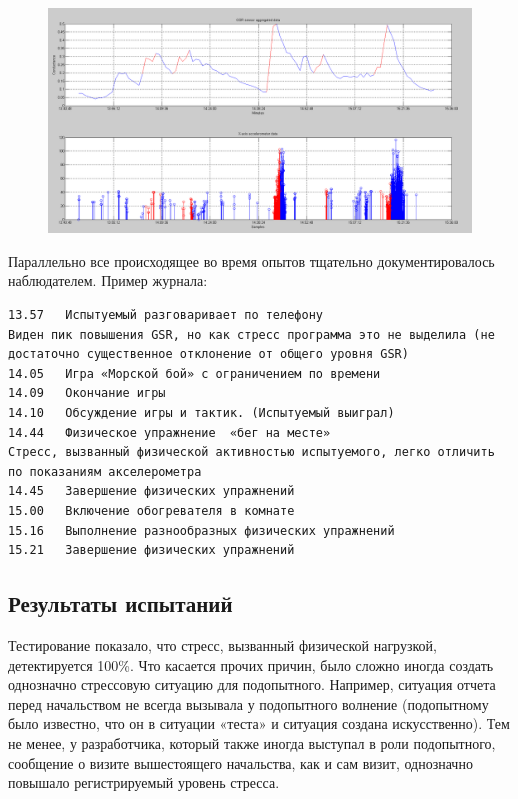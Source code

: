 \documentclass[10pt, a5paper]{article}
\begin{document}
\begin{figure}[h!]
  \centering
  \includegraphics[width=\textwidth]{107_2014_w_Karabutova_data.png}
\end{figure}

Параллельно все происходящее во время опытов тщательно документировалось наблюдателем. Пример журнала:

\begin{verbatim}
13.57	Испытуемый разговаривает по телефону 
Виден пик повышения GSR, но как стресс программа это не выделила (не достаточно существенное отклонение от общего уровня GSR)
14.05	Игра «Морской бой» с ограничением по времени
14.09 	Окончание игры
14.10 	Обсуждение игры и тактик. (Испытуемый выиграл)
14.44	Физическое упражнение  «бег на месте»
Стресс, вызванный физической активностью испытуемого, легко отличить по показаниям акселерометра
14.45	Завершение физических упражнений
15.00	Включение обогревателя в комнате
15.16	Выполнение разнообразных физических упражнений
15.21	Завершение физических упражнений
\end{verbatim}

\subsection*{Результаты испытаний}

Тестирование показало, что стресс, вызванный физической нагрузкой, детектируется 100\%. Что касается прочих причин, было сложно иногда создать однозначно стрессовую ситуацию для подопытного.
Например, ситуация отчета перед начальством не всегда вызывала у подопытного волнение (подопытному было известно, что он в ситуации «теста» и ситуация создана искусственно).
Тем не менее, у разработчика, который также иногда выступал в роли подопытного, сообщение о визите вышестоящего начальства, как и сам визит, однозначно повышало регистрируемый уровень стресса.
\end{document}
